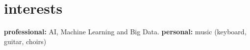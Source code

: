\documentclass[]{cv-style}          %
\begin{document}




\section{interests}
  \vspace{-0.2cm}

\textbf{professional:} AI, Machine Learning and Big Data. \textbf{personal:} music (keyboard, guitar, choirs)

\end{document}
